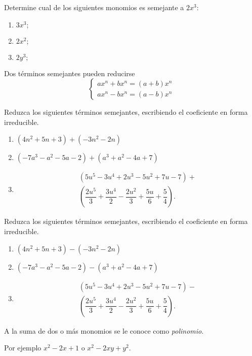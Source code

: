 	\begin{problema}
		Determine cual de los siguientes monomios es semejante a $2x^{3}:$
		\begin{enumerate}
			\item $3x^{3};$
			\item $2x^{2};$
			\item $2y^{3};$
		\end{enumerate}
		
	\end{problema}
	



	Dos t\'erminos semejantes pueden reducirse 
	$$\begin{cases}
		ax^{n}+bx^{n}=\left( a+b \right)x^{n}\\
		ax^{n}-bx^{n}=\left( a-b \right)x^{n}
	\end{cases}
	$$



	\begin{problema}
		Reduzca los siguientes t\'erminos semejantes, escribiendo el coeficiente en forma irreducible.
		\begin{enumerate}
			\item $\left( 4n^{2}+5n+3 \right)+\left( -3n^{2}-2n \right)$
			\item $\left( -7a^{3}-a^{2}-5a-2 \right)+\left( a^{3}+a^{2}-4a+7 \right)$
			\item \begin{eqnarray*}
				\left(5u^{5}-3u^{4}+2u^{3}-5u^{2}+7u-7\right)+ \\
				\left( \dfrac{2u^{5}}{3}+\dfrac{3u^{4}}{2}-\dfrac{2u^{2}}{3}+\dfrac{5u}{6}+\dfrac{5}{4} \right).
			\end{eqnarray*}
			
		\end{enumerate}
		
	\end{problema}
	



	\begin{problema}
		Reduzca los siguientes t\'erminos semejantes, escribiendo el coeficiente en forma irreducible.
		\begin{enumerate}
			\item $\left( 4n^{2}+5n+3 \right)-\left( -3n^{2}-2n \right)$
			\item $\left( -7a^{3}-a^{2}-5a-2 \right)-\left( a^{3}+a^{2}-4a+7 \right)$
			\item \begin{eqnarray*}
				\left(5u^{5}-3u^{4}+2u^{3}-5u^{2}+7u-7\right)- \\
				\left( \dfrac{2u^{5}}{3}+\dfrac{3u^{4}}{2}-\dfrac{2u^{2}}{3}+\dfrac{5u}{6}+\dfrac{5}{4} \right).
			\end{eqnarray*}
			
		\end{enumerate}
		
	\end{problema}
	



	\begin{observacion}
		A la suma de dos o más monomios se le conoce como \emph{polinomio}.
		
		Por ejemplo $x^{2}-2x+1$ o $x^{2}-2xy+y^{2}.$
		
	\end{observacion}
	

